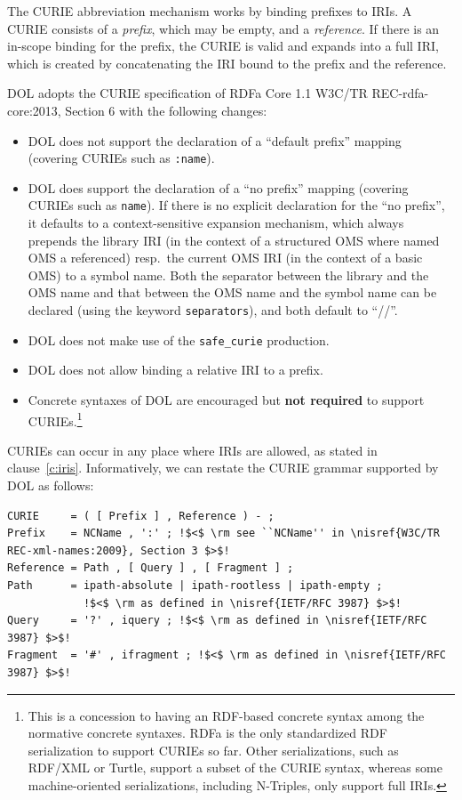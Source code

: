 \documentclass[10pt,fleqn,%
\ifpretendfinal
final%
\else
draft%
\fi,
]{scrreprt}
\makeatletter
\newcommand{\red}[1]{#1} %
\newcommand*\CommentAuthor{}
\renewcommand*\CommentAuthor{#1}}
\newcommand*\CommentDate{}
\renewcommand*\CommentDate{#1}}
\newcommand*\CommentId{}
\renewcommand*\CommentId{#1}}
\newcommand*\CommentType{}
\renewcommand*\CommentType{#1}}
\newcommand*{\SetCommentColorByType}[1]{%
\edef\localType{{#1}}%
\expandafter\ifstrequal\localType{q-aut}{\colorlet{CommentColor}{red}}{%
\expandafter\ifstrequal\localType{q-all}{\colorlet{CommentColor}{orange}}{%
\expandafter\ifstrequal\localType{todo}{\colorlet{CommentColor}{orange}}{%
\expandafter\ifstrequal\localType{fyi}{\colorlet{CommentColor}{lightgray}}{%
\colorlet{CommentColor}{yellow}}}}}}
\newcommand*{\SetCommentPrefixByType}[1]{%
\edef\localType{{#1}}%
\expandafter\@ifmtarg\localType{%
\edef\CommentPrefix{}%
}{%
\caseupper[q]{#1}%
\edef\CommentPrefix{\thestring: }%
}}
\newcommand*{\initComment}[1]{%
\setkeys{Comment}{#1}%
\SetCommentColorByType{\CommentType}%
\relax%
\SetCommentPrefixByType{\CommentType}%
\relax%
}
\newcommand*{\todonote}[2][]{%
\initComment{#1}%
\pdfcomment[author=\CommentAuthor,color=CommentColor,date=\CommentDate,id=\CommentId]{%
\CommentPrefix
#2}}
\renewcommand*{\todonote}[2][]{%
\initComment{#1}%
\ednote{\CommentPrefix #2}}
\newcommand*{\CLnote}[2][author=Christoph Lange]{%
\todonote[author=Christoph Lange,#1]{#2} 
}
\newcommand*{\syntax}[1]{\texttt{#1}}
\newcommand*{\notrequired}{\textbf{not required}\xspace}
\newcommand{\clauserefname}{clause}
\newcommand{\cref}[1]{\clauserefname~\ref{#1}}
\newcommand{\nisref}[1]{#1}
\makeatother
\begin{document}
The CURIE abbreviation mechanism works by binding prefixes to IRIs.  A CURIE consists of a 
\emph{prefix}, which may be empty, and a \emph{reference}.  If there is an in-scope binding for the 
prefix, the CURIE is valid and expands into a full IRI, which is created by concatenating the IRI 
bound to the prefix and the reference.

DOL adopts the CURIE specification of RDFa Core 1.1 \nisref{W3C/TR REC-rdfa-core:2013, Section 6} with the following changes:
\begin{itemize}
\item DOL does not support the declaration of a ``default prefix'' mapping %
(covering CURIEs such as \syntax{:name}).
\item DOL does support the declaration  of a ``no prefix'' mapping (covering CURIEs such as 
\syntax{name}). \red{If there is no explicit declaration for the ``no prefix'', it defaults to a 
context-sensitive expansion mechanism, which always prepends the library IRI (in the context of a 
structured OMS where named OMS a referenced) resp.\ the current OMS IRI (in the context of a basic 
OMS) to a symbol name. Both the separator between the library and the OMS name and that between the 
OMS name and the symbol name can be declared (using the keyword \syntax{separators}), and both default to ``//''.}

\item DOL does not make use of the \syntax{safe\_curie} production.
\item DOL does not allow binding a relative IRI to a prefix.
\item Concrete syntaxes of DOL are encouraged but \notrequired to support CURIEs.\footnote{This is 
a concession to having an RDF-based concrete syntax among the normative concrete syntaxes.  RDFa is 
the only standardized RDF serialization to support CURIEs so far.  Other serializations, such as 
RDF/XML or Turtle, support a subset of the CURIE syntax, whereas some machine-oriented 
serializations, including N-Triples, only support full IRIs.}
\end{itemize}

CURIEs can occur in any place where IRIs are allowed, as stated in \cref{c:iris}.  Informatively, 
we can restate the CURIE grammar supported by DOL as follows:
\begin{lstlisting}[language=ebnf,escapeinside={!!}]
CURIE     = ( [ Prefix ] , Reference ) - ;
Prefix    = NCName , ':' ; !$<$ \rm see ``NCName'' in \nisref{W3C/TR REC-xml-names:2009}, Section 3 $>$!
Reference = Path , [ Query ] , [ Fragment ] ;
Path      = ipath-absolute | ipath-rootless | ipath-empty ;
            !$<$ \rm as defined in \nisref{IETF/RFC 3987} $>$! 
Query     = '?' , iquery ; !$<$ \rm as defined in \nisref{IETF/RFC 3987} $>$! 
Fragment  = '#' , ifragment ; !$<$ \rm as defined in \nisref{IETF/RFC 3987} $>$! 
\end{lstlisting}
\end{document}
